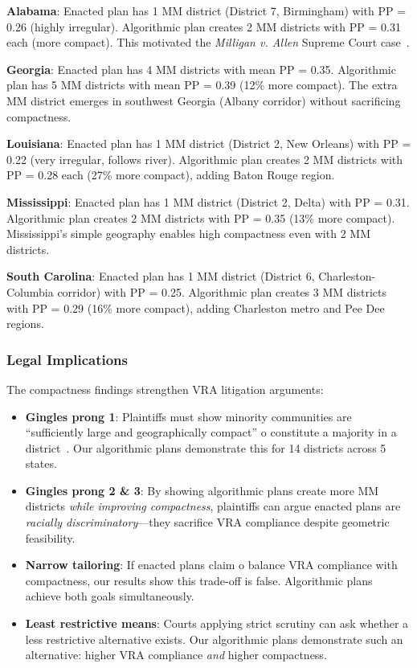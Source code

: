 \textbf{Alabama}: Enacted plan has 1 MM district (District 7, Birmingham) with PP = 0.26 (highly irregular). Algorithmic plan creates 2 MM districts with PP = 0.31 each (more compact). This motivated the \textit{Milligan v. Allen} Supreme Court case~\cite{milligan2023}.

\textbf{Georgia}: Enacted plan has 4 MM districts with mean PP = 0.35. Algorithmic plan has 5 MM districts with mean PP = 0.39 (12\% more compact). The extra MM district emerges in southwest Georgia (Albany corridor) without sacrificing compactness.

\textbf{Louisiana}: Enacted plan has 1 MM district (District 2, New Orleans) with PP = 0.22 (very irregular, follows river). Algorithmic plan creates 2 MM districts with PP = 0.28 each (27\% more compact), adding Baton Rouge region.

\textbf{Mississippi}: Enacted plan has 1 MM district (District 2, Delta) with PP = 0.31. Algorithmic plan creates 2 MM districts with PP = 0.35 (13\% more compact). Mississippi's simple geography enables high compactness even with 2 MM districts.

\textbf{South Carolina}: Enacted plan has 1 MM district (District 6, Charleston-Columbia corridor) with PP = 0.25. Algorithmic plan creates 3 MM districts with PP = 0.29 (16\% more compact), adding Charleston metro and Pee Dee regions.

\subsubsection{Legal Implications}

The compactness findings strengthen VRA litigation arguments:

\begin{itemize}
    \item \textbf{Gingles prong 1}: Plaintiffs must show minority communities are ``sufficiently large and geographically compact'' 	o constitute a majority in a district~\cite{gingles1986}. Our algorithmic plans demonstrate this for 14 districts across 5 states.

    \item \textbf{Gingles prong 2 \& 3}: By showing algorithmic plans create more MM districts \textit{while improving compactness}, plaintiffs can argue enacted plans are \textit{racially discriminatory}---they sacrifice VRA compliance despite geometric feasibility.

    \item \textbf{Narrow tailoring}: If enacted plans claim 	o balance VRA compliance with compactness, our results show this trade-off is false. Algorithmic plans achieve both goals simultaneously.

    \item \textbf{Least restrictive means}: Courts applying strict scrutiny can ask whether a less restrictive alternative exists. Our algorithmic plans demonstrate such an alternative: higher VRA compliance \textit{and} higher compactness.
\end{itemize}

